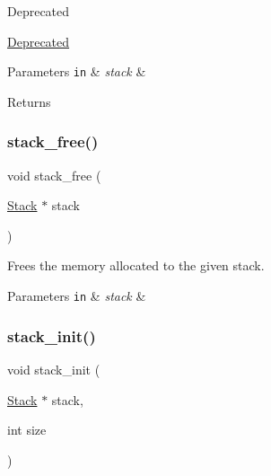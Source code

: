 \begin{DoxyRefDesc}{Deprecated}
\item[\hyperlink{deprecated__deprecated000001}{Deprecated}]\end{DoxyRefDesc}

\begin{DoxyParams}[1]{Parameters}
\mbox{\tt in}  & {\em stack} & \\
\hline
\end{DoxyParams}
\begin{DoxyReturn}{Returns}

\end{DoxyReturn}
\mbox{\label{structstack_afc04d6c48f275815a5a248a37b9f30bc}} 
\subsubsection{\texorpdfstring{stack\+\_\+free()}{stack\_free()}}
{\footnotesize\ttfamily void stack\+\_\+free (\begin{DoxyParamCaption}\item[{\hyperlink{structstack_aa7883e8bf747b9dedec990b539df2cc0}{Stack} $\ast$}]{stack }\end{DoxyParamCaption})}



Frees the memory allocated to the given stack. 


\begin{DoxyParams}[1]{Parameters}
\mbox{\tt in}  & {\em stack} & \\
\hline
\end{DoxyParams}
\mbox{\label{structstack_aebdb418b70e964383b7b0e2fbedde09e}} 
\subsubsection{\texorpdfstring{stack\+\_\+init()}{stack\_init()}}
{\footnotesize\ttfamily void stack\+\_\+init (\begin{DoxyParamCaption}\item[{\hyperlink{structstack_aa7883e8bf747b9dedec990b539df2cc0}{Stack} $\ast$}]{stack,  }\item[{int}]{size }\end{DoxyParamCaption})}




